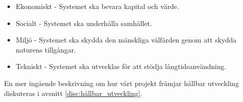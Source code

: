 \begin{itemize}
	\item Ekonomiskt -  Systemet ska bevara kapital och värde.
	\item Socialt - Systemet ska underhålla samhället.
	\item Miljö - Systemet ska skydda den mänskliga välfärden genom att skydda naturens tillgångar.
	\item Tekniskt - Systemet ska utvecklas för att stödja långtidsanvändning.
\end{itemize}
En mer ingående beskrivning om hur vårt projekt främjar hållbar utveckling diskuteras i avsnitt \ref{disc:hållbar_utveckling}.


